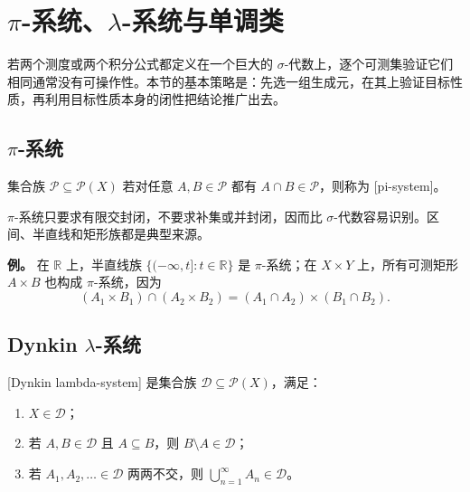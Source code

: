 \section{\texorpdfstring{\(\pi\)}{π}-系统、\texorpdfstring{\(\lambda\)}{λ}-系统与单调类}
\label{b1:sec:0103}

若两个测度或两个积分公式都定义在一个巨大的 \(\sigma\)-代数上，逐个可测集验证它们相同通常没有可操作性。本节的基本策略是：先选一组生成元，在其上验证目标性质，再利用目标性质本身的闭性把结论推广出去。

\subsection{\texorpdfstring{\(\pi\)}{π}-系统}
\label{b1:subsec:010301}

\begin{definition}
\label{b1:def:pi-system}
集合族 \(\mathcal P\subseteq\mathcal P(X)\) 若对任意 \(A,B\in\mathcal P\) 都有 \(A\cap B\in\mathcal P\)，则称为 [pi-system]。
\end{definition}

\(\pi\)-系统只要求有限交封闭，不要求补集或并封闭，因而比 \(\sigma\)-代数容易识别。区间、半直线和矩形族都是典型来源。

\begin{remark}
\label{b1:rem:pi-systems}
\textbf{例。} 在 \(\mathbb R\) 上，半直线族 \(\{(-\infty,t]:t\in\mathbb R\}\) 是 \(\pi\)-系统；在 \(X\times Y\) 上，所有可测矩形 \(A\times B\) 也构成 \(\pi\)-系统，因为
\[
(A_1\times B_1)\cap(A_2\times B_2)
=(A_1\cap A_2)\times(B_1\cap B_2).
\]
\end{remark}

\subsection{Dynkin \texorpdfstring{\(\lambda\)}{λ}-系统}
\label{b1:subsec:010302}

\begin{definition}
\label{b1:def:lambda-system}
[Dynkin lambda-system] 是集合族 \(\mathcal D\subseteq\mathcal P(X)\)，满足：
\begin{enumerate}
  \item \(X\in\mathcal D\)；
  \item 若 \(A,B\in\mathcal D\) 且 \(A\subseteq B\)，则 \(B\setminus A\in\mathcal D\)；
  \item 若 \(A_1,A_2,\ldots\in\mathcal D\) 两两不交，则 \(\bigcup_{n=1}^{\infty}A_n\in\mathcal D\)。
\end{enumerate}
\end{definition}

